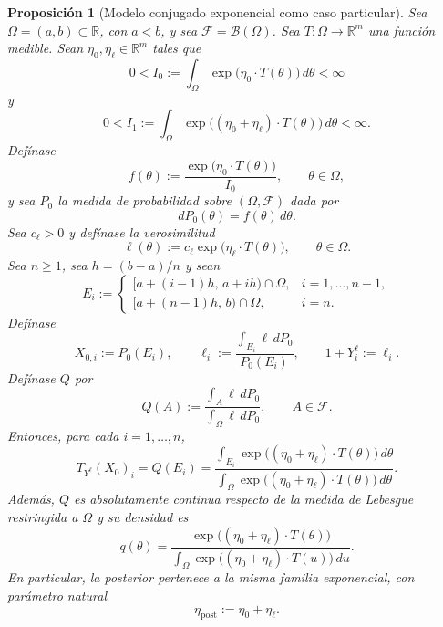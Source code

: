 ﻿\documentclass[12pt]{article}
\newtheorem{proposicion}{Proposición}[section]
\begin{document}
\begin{proposicion}[Modelo conjugado exponencial como caso particular]\label{prop:conjugado_exponencial_CI}
Sea $\Omega=(a,b)\subset\mathbb R$, con $a<b$, y sea $\mathcal F=\mathcal B(\Omega)$. Sea $T:\Omega\to\mathbb R^m$ una función medible. Sean $\eta_0,\eta_\ell\in\mathbb R^m$ tales que
\[
0<
I_0:=\int_\Omega \exp\bigl(\eta_0\cdot T(\theta)\bigr)\,d\theta
<\infty
\]
y
\[
0<
I_1:=\int_\Omega \exp\bigl((\eta_0+\eta_\ell)\cdot T(\theta)\bigr)\,d\theta
<\infty.
\]
Defínase
\[
f(\theta):=\frac{\exp\bigl(\eta_0\cdot T(\theta)\bigr)}{I_0},
\qquad \theta\in\Omega,
\]
y sea $P_0$ la medida de probabilidad sobre $(\Omega,\mathcal F)$ dada por
\[
dP_0(\theta)=f(\theta)\,d\theta.
\]
Sea $c_\ell>0$ y defínase la verosimilitud
\[
\ell(\theta):=c_\ell\exp\bigl(\eta_\ell\cdot T(\theta)\bigr),
\qquad \theta\in\Omega.
\]
Sea $n\ge1$, sea $h=(b-a)/n$ y sean
\[
E_i:=
\begin{cases}
[a+(i-1)h,\,a+ih)\cap\Omega, & i=1,\dots,n-1,\\[4pt]
[a+(n-1)h,\,b)\cap\Omega, & i=n.
\end{cases}
\]
Defínase
\[
X_{0,i}:=P_0(E_i),
\qquad
\ell_i:=\frac{\displaystyle\int_{E_i}\ell\,dP_0}{P_0(E_i)},
\qquad
1+Y_i^\ell:=\ell_i.
\]
Defínase $Q$ por
\[
Q(A):=\frac{\displaystyle\int_A\ell\,dP_0}{\displaystyle\int_\Omega\ell\,dP_0},
\qquad A\in\mathcal F.
\]
Entonces, para cada $i=1,\dots,n$,
\[
T_{Y^\ell}(X_0)_i
=
Q(E_i)
=
\frac{\displaystyle\int_{E_i}\exp\bigl((\eta_0+\eta_\ell)\cdot T(\theta)\bigr)\,d\theta}{\displaystyle\int_\Omega\exp\bigl((\eta_0+\eta_\ell)\cdot T(\theta)\bigr)\,d\theta}.
\]
Además, $Q$ es absolutamente continua respecto de la medida de Lebesgue restringida a $\Omega$ y su densidad es
\[
q(\theta)
=
\frac{\exp\bigl((\eta_0+\eta_\ell)\cdot T(\theta)\bigr)}{\displaystyle\int_\Omega\exp\bigl((\eta_0+\eta_\ell)\cdot T(u)\bigr)\,du}.
\]
En particular, la posterior pertenece a la misma familia exponencial, con parámetro natural
\[
\eta_{\mathrm{post}}:=\eta_0+\eta_\ell.
\]
\end{proposicion}
\end{document}
